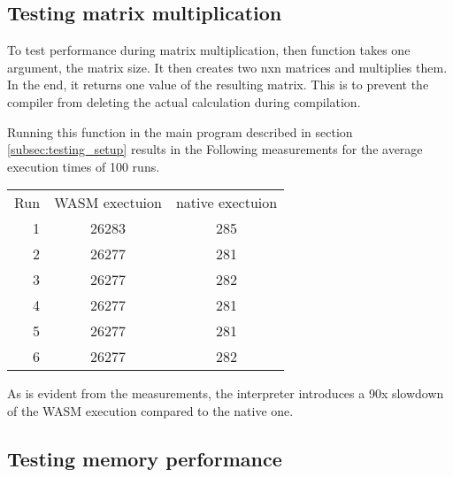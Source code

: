 \subsection{Testing matrix multiplication}
To test performance during matrix multiplication, then function takes one argument, the matrix size. It then creates two nxn matrices and multiplies them. In the end, it returns one value of the resulting matrix. This is to prevent the compiler from deleting the actual calculation during compilation.

Running this function in the main program described in section \ref{subsec:testing_setup} results in the Following measurements for the average execution times of 100 runs.

\begin{tabular}{rcc}
    Run & WASM exectuion & native exectuion \\
    1 & 26283 & 285 \\
    2 & 26277 & 281 \\
    3 & 26277 & 282 \\
    4 & 26277 & 281 \\
    5 & 26277 & 281 \\
    6 & 26277 & 282 \\
\end{tabular}

As is evident from the measurements, the interpreter introduces a 90x slowdown of the WASM execution compared to the native one.
\subsection{Testing memory performance}
